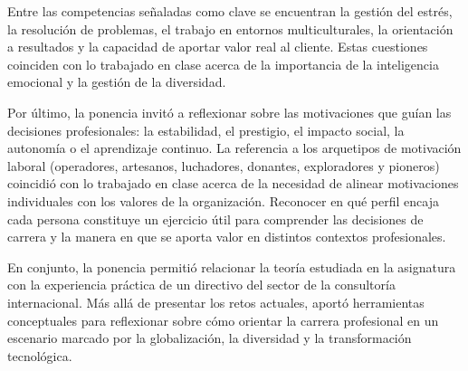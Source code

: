 Entre las competencias señaladas como clave se encuentran la gestión del estrés, la resolución de problemas, el trabajo en entornos multiculturales, la orientación a resultados y la capacidad de aportar valor real al cliente. Estas cuestiones coinciden con lo trabajado en clase acerca de la importancia de la inteligencia emocional y la gestión de la diversidad.  

Por último, la ponencia invitó a reflexionar sobre las motivaciones que guían las decisiones profesionales: la estabilidad, el prestigio, el impacto social, la autonomía o el aprendizaje continuo. La referencia a los arquetipos de motivación laboral (operadores, artesanos, luchadores, donantes, exploradores y pioneros) coincidió con lo trabajado en clase acerca de la necesidad de alinear motivaciones individuales con los valores de la organización. Reconocer en qué perfil encaja cada persona constituye un ejercicio útil para comprender las decisiones de carrera y la manera en que se aporta valor en distintos contextos profesionales.  

En conjunto, la ponencia permitió relacionar la teoría estudiada en la asignatura con la experiencia práctica de un directivo del sector de la consultoría internacional. Más allá de presentar los retos actuales, aportó herramientas conceptuales para reflexionar sobre cómo orientar la carrera profesional en un escenario marcado por la globalización, la diversidad y la transformación tecnológica.  
